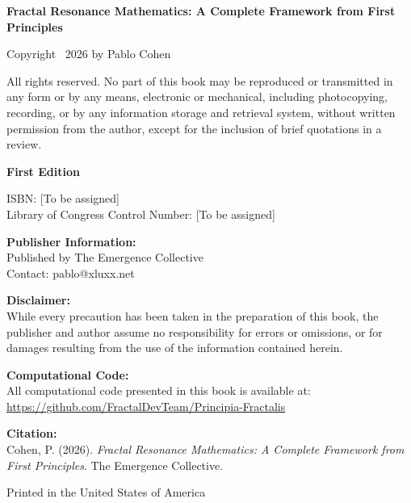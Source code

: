 \thispagestyle{empty}

\vspace*{5cm}

\noindent
\textbf{Fractal Resonance Mathematics: A Complete Framework from First Principles}

\vspace{1cm}

\noindent
Copyright \textcopyright\ 2026 by Pablo Cohen

\vspace{0.5cm}

\noindent
All rights reserved. No part of this book may be reproduced or transmitted in any form or by any means, electronic or mechanical, including photocopying, recording, or by any information storage and retrieval system, without written permission from the author, except for the inclusion of brief quotations in a review.

\vspace{0.5cm}

\noindent
\textbf{First Edition}

\vspace{0.5cm}

\noindent
ISBN: [To be assigned]\\
Library of Congress Control Number: [To be assigned]

\vspace{1cm}

\noindent
\textbf{Publisher Information:}\\
Published by The Emergence Collective\\
Contact: pablo@xluxx.net

\vspace{1cm}

\noindent
\textbf{Disclaimer:}\\
While every precaution has been taken in the preparation of this book, the publisher and author assume no responsibility for errors or omissions, or for damages resulting from the use of the information contained herein.

\vspace{1cm}

\noindent
\textbf{Computational Code:}\\
All computational code presented in this book is available at:\\
\url{https://github.com/FractalDevTeam/Principia-Fractalis}

\vspace{0.5cm}

\noindent
\textbf{Citation:}\\
Cohen, P. (2026). \textit{Fractal Resonance Mathematics: A Complete Framework from First Principles}. The Emergence Collective.

\vspace{1cm}

\noindent
Printed in the United States of America
